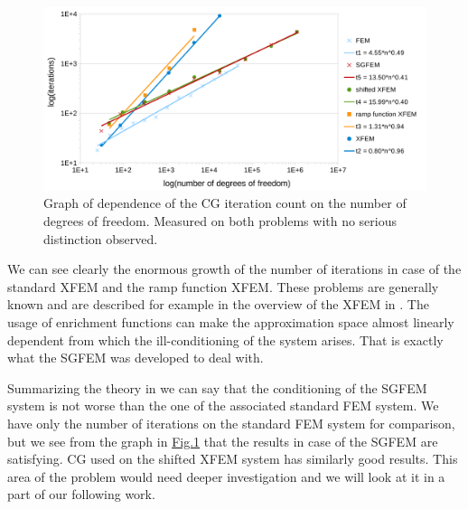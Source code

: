 \documentclass{elsarticle}
\newcommand{\fig}[1]{\hyperref[#1]{Fig.\ref{#1}}}
\begin{document}
\begin{figure}[!htb]
  \centering    
  \includegraphics[width=\textwidth]{results/iterations.pdf}
  \caption[Iterations graph]{Graph of dependence of the CG iteration count on the 
  number of degrees of freedom. Measured on both problems with no serious distinction observed.}
  \label{fig:iterations}
\end{figure}
%
We can see clearly the enormous growth of the number of iterations in case of the standard XFEM and the ramp 
function XFEM. These problems are generally known and are described for example in the overview of the XFEM in
\cite{fries_xfem_overview_2010}. The usage of enrichment functions can make the approximation space almost linearly 
dependent from which the ill-conditioning of the system arises. That is exactly what the SGFEM was developed to deal with.

Summarizing the theory in \cite{babuska_stable_2012} we can say that the conditioning of the SGFEM system is not worse than the one of the 
associated standard FEM system. We have only the number of iterations on the standard FEM system for comparison, 
but we see from the graph in \fig{fig:iterations} that the results in case of the SGFEM are satisfying.
CG used on the shifted XFEM system has similarly good results. This area of the problem would need deeper 
investigation and we will look at it in a part of our following work.
\end{document}
